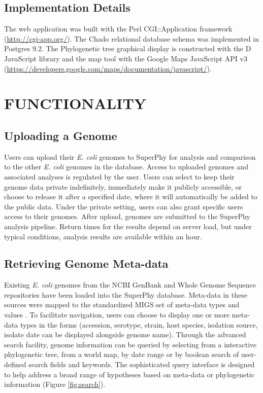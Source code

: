 \documentclass[a4paper,twoside]{article}
\begin{document}
\subsection{Implementation Details}

The web application was built with the Perl CGI::Application framework (\url{http://cgi-app.org/}). The Chado relational database schema was implemented in Postgres 9.2. The Phylogenetic tree graphical display is constructed with the D JavaScript library \cite{bostock2011d3} and the map tool with the Google Maps JavaScript API v3 (\url{https://developers.google.com/maps/documentation/javascript/}).

\section{\uppercase{Functionality}}
\label{sec:functionality}

\subsection{Uploading a Genome}

Users can upload their \textit{E. coli} genomes to SuperPhy for analysis and comparison to the other \textit{E. coli} genomes in the database.  Access to uploaded genomes and associated analyses is regulated by the user. Users can select to keep their genome data private indefinitely, immediately make it publicly accessible, or choose to release it after a specified date, where it will automatically be added to the public data.  Under the private setting, users can also grant specific users access to their genomes. After upload, genomes are submitted to the SuperPhy analysis pipeline. Return times for the results depend on server load, but under typical conditions, analysis results are available within an hour.

\subsection{Retrieving Genome Meta-data}

Existing \textit{E. coli} genomes from the NCBI GenBank and Whole Genome Sequence repositories \cite{benson2013genbank} have been loaded into the SuperPhy database. Meta-data in these sources were mapped to the standardized MIGS set of meta-data types and values \cite{field2008}. To facilitate navigation, users can choose to display one or more meta-data types in the forms (accession, serotype, strain, host species, isolation source, isolate date can be displayed alongside genome name). Through the advanced search facility, genome information can be queried by selecting from a interactive phylogenetic tree, from a world map, by date range or by boolean search of user-defined search fields and keywords.  The sophisticated query interface is designed to help address a broad range of hypotheses based on meta-data or phylogenetic information (Figure \ref{fig:search}).
\end{document}
